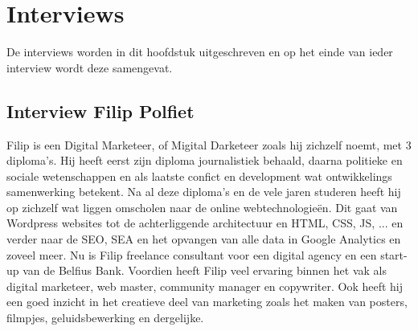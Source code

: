 
\chapter{Interviews}
\label{ch:interviews}

De interviews worden in dit hoofdstuk uitgeschreven en op het einde van ieder interview wordt deze samengevat.

\section{Interview Filip Polfiet}
\label{sec:interview-filip}

Filip is een Digital Marketeer, of Migital Darketeer zoals hij zichzelf noemt, met 3 diploma's. Hij heeft eerst zijn diploma journalistiek behaald, daarna politieke en sociale wetenschappen en als laatste confict en development wat ontwikkelings samenwerking betekent. Na al deze diploma's en de vele jaren studeren heeft hij op zichzelf wat liggen omscholen naar de online webtechnologieën. Dit gaat van Wordpress websites tot de achterliggende architectuur en HTML, CSS, JS, ... en verder naar de SEO, SEA en het opvangen van alle data in Google Analytics en zoveel meer. Nu is Filip freelance consultant voor een digital agency en een start-up van de Belfius Bank. Voordien heeft Filip veel ervaring binnen het vak als digital marketeer, web master, community manager en copywriter. Ook heeft hij een goed inzicht in het creatieve deel van marketing zoals het maken van posters, filmpjes, geluidsbewerking en dergelijke.

